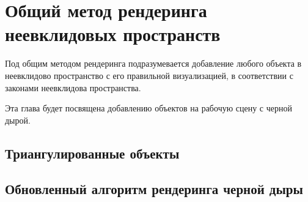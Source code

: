 \section{Общий метод рендеринга неевклидовых пространств}
\label{sec:Chapter3} 

Под общим методом рендеринга подразумевается добавление любого объекта в неевклидово пространство с его правильной визуализацией, в соответствии с законами неевклидова пространства.

Эта глава будет посвящена добавлению объектов на рабочую сцену с черной дырой.

\subsection{Триангулированные объекты}
\subsection{Обновленный алгоритм рендеринга черной дыры}

\newpage